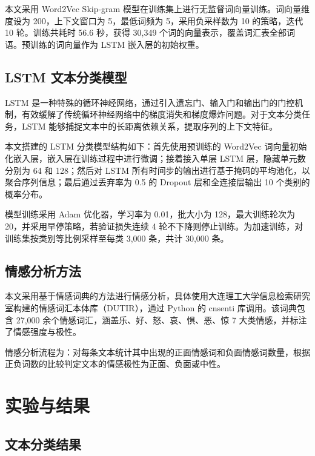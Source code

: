 \documentclass[12pt,a4paper]{article}
\begin{document}
本文采用 Word2Vec Skip-gram 模型在训练集上进行无监督词向量训练。词向量维度设为 200，上下文窗口为 5，最低词频为 5，采用负采样数为 10 的策略，迭代 10 轮。训练共耗时 56.6 秒，获得 30{,}349 个词的向量表示，覆盖词汇表全部词语。预训练的词向量作为 LSTM 嵌入层的初始权重。

\subsection{LSTM 文本分类模型}

LSTM 是一种特殊的循环神经网络，通过引入遗忘门、输入门和输出门的门控机制，有效缓解了传统循环神经网络中的梯度消失和梯度爆炸问题。对于文本分类任务，LSTM 能够捕捉文本中的长距离依赖关系，提取序列的上下文特征。

本文搭建的 LSTM 分类模型结构如下：首先使用预训练的 Word2Vec 词向量初始化嵌入层，嵌入层在训练过程中进行微调；接着接入单层 LSTM 层，隐藏单元数分别为 64 和 128；然后对 LSTM 所有时间步的输出进行基于掩码的平均池化，以聚合序列信息；最后通过丢弃率为 0.5 的 Dropout 层和全连接层输出 10 个类别的概率分布。

模型训练采用 Adam 优化器，学习率为 0.01，批大小为 128，最大训练轮次为 20，并采用早停策略，若验证损失连续 4 轮不下降则停止训练。为加速训练，对训练集按类别等比例采样至每类 3{,}000 条，共计 30{,}000 条。

\subsection{情感分析方法}

本文采用基于情感词典的方法进行情感分析，具体使用大连理工大学信息检索研究室构建的情感词汇本体库（DUTIR），通过 Python 的 cnsenti 库调用。该词典包含 27{,}000 余个情感词汇，涵盖乐、好、怒、哀、惧、恶、惊 7 大类情感，并标注了情感强度与极性。

情感分析流程为：对每条文本统计其中出现的正面情感词和负面情感词数量，根据正负词数的比较判定文本的情感极性为正面、负面或中性。

\section{实验与结果}

\subsection{文本分类结果}
\end{document}
